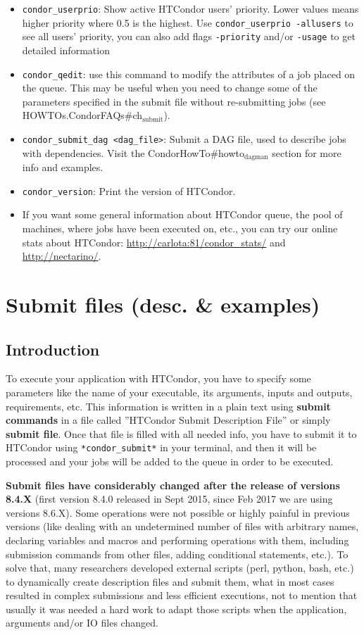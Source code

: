 \documentclass[a4paper,10pt]{article}
\begin{document}
\begin{itemize}
\item \texttt{condor\_userprio}: Show active HTCondor users' priority. Lower values means
higher priority where 0.5 is the highest. Use \texttt{condor\_userprio -allusers} to
see all users' priority, you can also add flags \texttt{-priority} and/or \texttt{-usage} to
get detailed information
\item \texttt{condor\_qedit}: use this command to modify the attributes of a job placed on
the queue. This may be useful when you need to change some of the parameters
specified in the submit file without re-submitting jobs (see
HOWTOs.CondorFAQs\#ch\(_{\text{submit}}\)).
\item \texttt{condor\_submit\_dag <dag\_file>}: Submit a DAG file, used to describe jobs
with dependencies. Visit the CondorHowTo\#howto\(_{\text{dagman}}\) section for more info
and examples.
\item \texttt{condor\_version}: Print the version of HTCondor.
\item If you want some general information about HTCondor queue, the pool of
machines, where jobs have been executed on, etc., you can try our online stats
about HTCondor: \url{http://carlota:81/condor\_stats/} and \url{http://nectarino/}.
\end{itemize}


\section{Submit files (desc. \& examples)}
\label{sec:org6f85953}

\subsection{Introduction}
\label{sec:org344c8c6}

To execute your application with HTCondor, you have to specify some parameters
like the name of your executable, its arguments, inputs and outputs,
requirements, etc. This information is written in a plain text using \textbf{submit
commands} in a file called ''HTCondor Submit Description File'' or simply
\textbf{submit file}. Once that file is filled with all needed info, you have to submit
it to HTCondor using \texttt{*condor\_submit*} in your terminal, and then it will be
processed and your jobs will be added to the queue in order to be executed.

\textbf{Submit files have considerably changed after the release of versions 8.4.X}
(first version 8.4.0 released in Sept 2015, since Feb 2017 we are using versions
8.6.X). Some operations were not possible or highly painful in previous versions
(like dealing with an undetermined number of files with arbitrary names,
declaring variables and macros and performing operations with them, including
submission commands from other files, adding conditional statements, etc.). To
solve that, many researchers developed external scripts (perl, python, bash,
etc.) to dynamically create description files and submit them, what in most
cases resulted in complex submissions and less efficient executions, not to
mention that usually it was needed a hard work to adapt those scripts when the
application, arguments and/or IO files changed.
\end{document}
